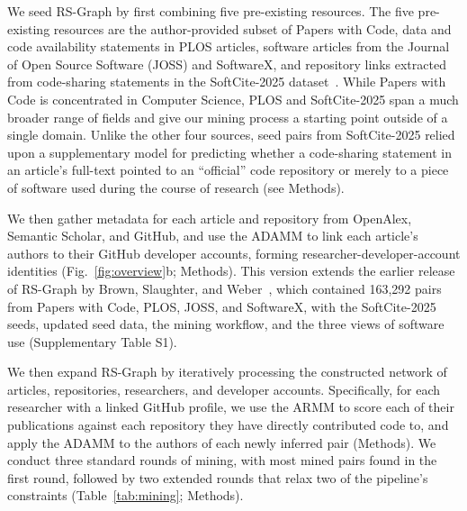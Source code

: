 \documentclass[pdflatex,sn-nature]{sn-jnl}%
\begin{document}
We seed RS-Graph by first combining five pre-existing resources. The five pre-existing resources are the author-provided subset of Papers with Code, data and code availability statements in PLOS articles, software articles from the Journal of Open Source Software (JOSS) and SoftwareX, and repository links extracted from code-sharing statements in the SoftCite-2025 dataset~\cite{howison_2025_15149379}. While Papers with Code is concentrated in Computer Science, PLOS and SoftCite-2025 span a much broader range of fields and give our mining process a starting point outside of a single domain. Unlike the other four sources, seed pairs from SoftCite-2025 relied upon a supplementary model for predicting whether a code-sharing statement in an article's full-text pointed to an ``official'' code repository or merely to a piece of software used during the course of research (see Methods).

We then gather metadata for each article and repository from OpenAlex, Semantic Scholar, and GitHub, and use the ADAMM to link each article's authors to their GitHub developer accounts, forming researcher-developer-account identities (Fig.~\ref{fig:overview}b; Methods). This version extends the earlier release of RS-Graph by Brown, Slaughter, and Weber~\cite{brown2026code}, which contained 163,292 pairs from Papers with Code, PLOS, JOSS, and SoftwareX, with the SoftCite-2025 seeds, updated seed data, the mining workflow, and the three views of software use (Supplementary Table S1).

We then expand RS-Graph by iteratively processing the constructed network of articles, repositories, researchers, and developer accounts. Specifically, for each researcher with a linked GitHub profile, we use the ARMM to score each of their publications against each repository they have directly contributed code to, and apply the ADAMM to the authors of each newly inferred pair (Methods). We conduct three standard rounds of mining, with most mined pairs found in the first round, followed by two extended rounds that relax two of the pipeline's constraints (Table~\ref{tab:mining}; Methods).
\end{document}
